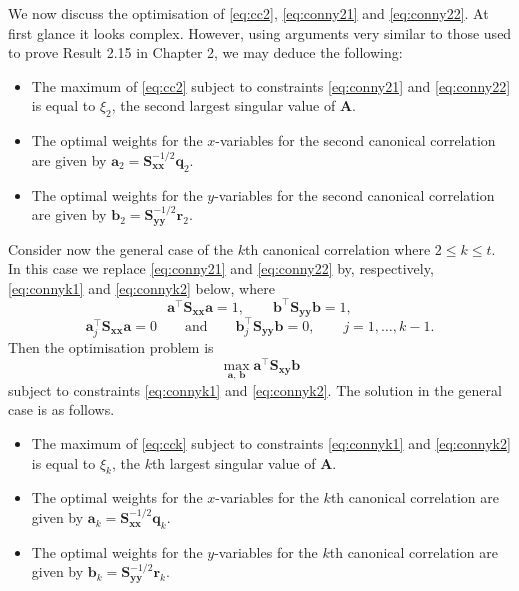 \documentclass[]{book}
\providecommand{\tightlist}{%
  \setlength{\itemsep}{0pt}\setlength{\parskip}{0pt}}
\theoremstyle{definition}
\theoremstyle{definition}
\theoremstyle{definition}
\theoremstyle{remark}
\begin{document}
We now discuss the optimisation of \eqref{eq:cc2}, \eqref{eq:conny21} and \eqref{eq:conny22}. At first glance it looks complex. However, using arguments very similar to those used to prove
Result 2.15 in Chapter 2, we may deduce the following:

\begin{itemize}
\tightlist
\item
  The maximum of \eqref{eq:cc2} subject to constraints \eqref{eq:conny21} and \eqref{eq:conny22} is equal to \(\xi_2\), the second largest singular value of \(\boldsymbol A\).
\item
  The optimal weights for the \(x\)-variables for the second canonical correlation are given by \(\boldsymbol a_2=\boldsymbol S_{\boldsymbol x\boldsymbol x}^{-1/2} \boldsymbol q_2\).
\item
  The optimal weights for the \(y\)-variables for the second canonical correlation are given by \(\boldsymbol b_2=\boldsymbol S_{\boldsymbol y\boldsymbol y}^{-1/2}\boldsymbol r_2\).
\end{itemize}

Consider now the general case of the \(k\)th canonical correlation where \(2 \leq k \leq t\). In this case we replace \eqref{eq:conny21} and \eqref{eq:conny22} by, respectively,
\eqref{eq:connyk1} and \eqref{eq:connyk2} below, where
\begin{equation}
\boldsymbol a^\top \boldsymbol S_{\boldsymbol x\boldsymbol x}\boldsymbol a= 1, \qquad \boldsymbol b^\top \boldsymbol S_{\boldsymbol y\boldsymbol y}\boldsymbol b=1,
\label{eq:connyk1}
\end{equation}
\begin{equation}
\boldsymbol a_j^\top \boldsymbol S_{\boldsymbol x\boldsymbol x} \boldsymbol a=0 \qquad \text{and} \qquad \boldsymbol b_j^\top \boldsymbol S_{\boldsymbol y\boldsymbol y}\boldsymbol b=0, \qquad j=1, \ldots , k-1.
\label{eq:connyk2}
\end{equation}
Then the optimisation problem is
\begin{equation}
\max_{\boldsymbol a, \, \boldsymbol b} \boldsymbol a^\top \boldsymbol S_{\boldsymbol x\boldsymbol y}\boldsymbol b
\label{eq:cck}
\end{equation}
subject to constraints \eqref{eq:connyk1} and \eqref{eq:connyk2}. The solution in the general case is as follows.

\begin{itemize}
\tightlist
\item
  The maximum of \eqref{eq:cck} subject to constraints \eqref{eq:connyk1} and \eqref{eq:connyk2} is equal to \(\xi_k\), the \(k\)th largest singular value of \(\boldsymbol A\).
\item
  The optimal weights for the \(x\)-variables for the \(k\)th canonical correlation are given by \(\boldsymbol a_k=\boldsymbol S_{\boldsymbol x\boldsymbol x}^{-1/2} \boldsymbol q_k\).
\item
  The optimal weights for the \(y\)-variables for the \(k\)th canonical correlation are given by \(\boldsymbol b_k=\boldsymbol S_{\boldsymbol y\boldsymbol y}^{-1/2}\boldsymbol r_k\).
\end{itemize}
\end{document}
